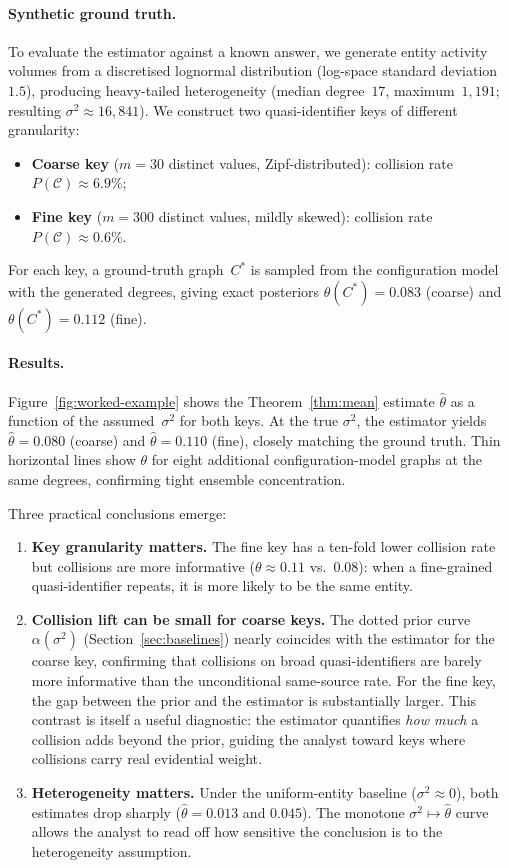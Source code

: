 \documentclass[11pt]{article}
\newcommand{\1}{\mathbf{1}}
\newcommand{\coll}{\mathcal{C}} %
\theoremstyle{plain}
\theoremstyle{definition}
\begin{document}
\paragraph{Synthetic ground truth.}
To evaluate the estimator against a known answer, we generate entity activity volumes from a discretised lognormal distribution (log-space standard deviation $1.5$), producing heavy-tailed heterogeneity (median degree~$17$, maximum~$1{,}191$; resulting $\sigma^2\approx 16{,}841$).
We construct two quasi-identifier keys of different granularity:
\begin{itemize}[leftmargin=*]
\item \textbf{Coarse key} ($m=30$ distinct values, Zipf-distributed): collision rate $P(\coll)\approx 6.9\%$;
\item \textbf{Fine key} ($m=300$ distinct values, mildly skewed): collision rate $P(\coll)\approx 0.6\%$.
\end{itemize}
For each key, a ground-truth graph~$C^*$ is sampled from the configuration model with the generated degrees, giving exact posteriors $\theta(C^*)=0.083$ (coarse) and $\theta(C^*)=0.112$ (fine).

\paragraph{Results.}
Figure~\ref{fig:worked-example} shows the Theorem~\ref{thm:mean} estimate $\widehat\theta$ as a function of the assumed~$\sigma^2$ for both keys.
At the true $\sigma^2$, the estimator yields $\widehat\theta=0.080$ (coarse) and $\widehat\theta=0.110$ (fine), closely matching the ground truth.
Thin horizontal lines show $\theta$ for eight additional configuration-model graphs at the same degrees, confirming tight ensemble concentration.

Three practical conclusions emerge:
\begin{enumerate}[leftmargin=*]
\item \textbf{Key granularity matters.}
      The fine key has a ten-fold lower collision rate but collisions are more informative ($\theta\approx 0.11$ vs.\ $0.08$):
      when a fine-grained quasi-identifier repeats, it is more likely to be the same entity.
\item \textbf{Collision lift can be small for coarse keys.}
      The dotted prior curve $\alpha(\sigma^2)$ (Section~\ref{sec:baselines}) nearly coincides with the estimator for the coarse key,
      confirming that collisions on broad quasi-identifiers are barely more informative than the unconditional same-source rate.
      For the fine key, the gap between the prior and the estimator is substantially larger.
      This contrast is itself a useful diagnostic: the estimator quantifies \emph{how much} a collision adds beyond the prior, guiding the analyst toward keys where collisions carry real evidential weight.
\item \textbf{Heterogeneity matters.}
      Under the uniform-entity baseline ($\sigma^2\approx 0$), both estimates drop sharply ($\widehat\theta=0.013$ and $0.045$).
      The monotone $\sigma^2\mapsto\widehat\theta$ curve allows the analyst to read off how sensitive the conclusion is to the heterogeneity assumption.
\end{enumerate}
\end{document}
